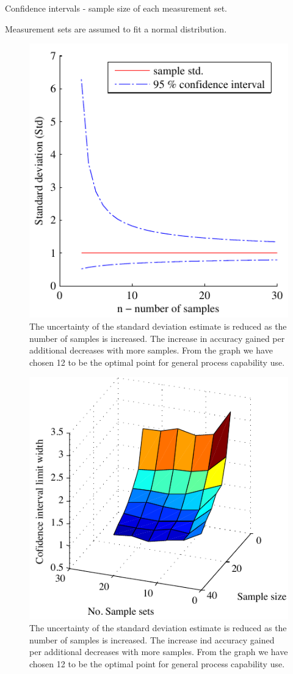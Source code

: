 \documentclass[aip,amsmath, reprint, author-year]{revtex4-1}
\begin{document}
Confidence intervals - sample size of each measurement set.

Measurement sets are assumed to fit a normal distribution.


\begin{figure}
\includegraphics{stats_std_confidence.pdf}
\caption{\label{fig:std_uncertainty}The uncertainty of the standard deviation estimate is reduced as the number of samples is increased. The increase in accuracy gained per additional decreases with more samples. From the graph we have chosen 12 to be the optimal point for general process capability use.}
\end{figure}

\begin{figure}
\includegraphics{CLW90_surf.pdf}
\caption{\label{fig:cl_surf}The uncertainty of the standard deviation estimate is reduced as the number of samples is increased. The increase ind accuracy gained per additional decreases with more samples. From the graph we have chosen 12 to be the optimal point for general process capability use.}
\end{figure}
\end{document}
